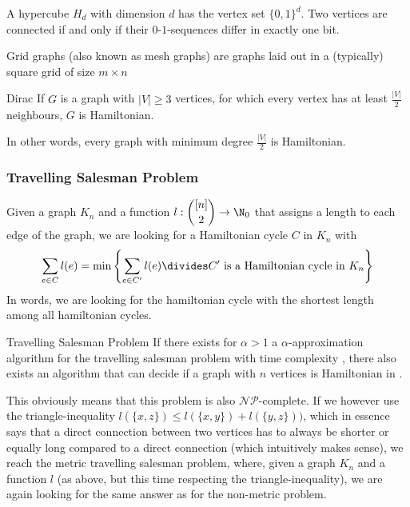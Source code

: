 A hypercube $H_d$ with dimension $d$ has the vertex set $\{0, 1\}^d$.
Two vertices are connected if and only if their $0$-$1$-sequences differ in exactly one bit.
\begin{center}
\end{center}
Grid graphs (also known as mesh graphs) are graphs laid out in a (typically) square grid of size $m \times n$
\begin{center}
\end{center}

\begin{theorem}[]{Dirac}
    If $G$ is a graph with $|V| \geq 3$ vertices, for which every vertex has at least $\frac{|V|}{2}$ neighbours, $G$ is Hamiltonian.
\end{theorem}
In other words, every graph with minimum degree $\frac{|V|}{2}$ is Hamiltonian.



\subsubsection{Travelling Salesman Problem}

Given a graph $K_n$ and a function $\displaystyle l : {[n] \choose 2} \rightarrow \N_0$ that assigns a length to each edge of the graph, we are looking for a Hamiltonian cycle $C$ in $K_n$ with
\begin{align*}
    \sum_{e \in C} l(e) = \min \left\{ \sum_{e \in C'} l(e) \divides C' \text{ is a Hamiltonian cycle in } K_n \right\}
\end{align*}
In words, we are looking for the hamiltonian cycle with the shortest length among all hamiltonian cycles.

\begin{theorem}[]{Travelling Salesman Problem}
    If there exists for $\alpha > 1$ a $\alpha$-approximation algorithm for the travelling salesman problem with time complexity , there also exists an algorithm that can decide if a graph with $n$ vertices is Hamiltonian in .
\end{theorem}
This obviously means that this problem is also $\mathcal{N}\mathcal{P}$-complete.
If we however use the triangle-inequality $l(\{x, z\}) \leq l(\{x, y\}) + l(\{y, z\}))$, which in essence says that a direct connection between two vertices has to always be shorter or equally long compared to a direct connection (which intuitively makes sense),
we reach the metric travelling salesman problem, where, given a graph $K_n$ and a function $l$ (as above, but this time respecting the triangle-inequality), we are again looking for the same answer as for the non-metric problem.


